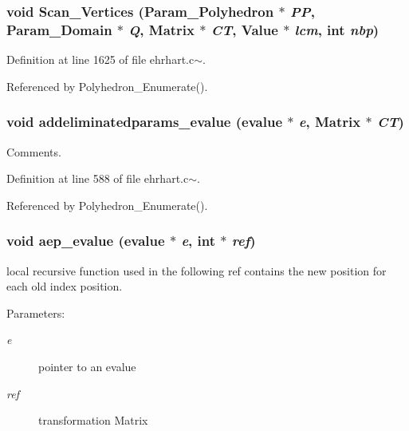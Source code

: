 \subsubsection{\setlength{\rightskip}{0pt plus 5cm}void Scan\_\-Vertices (Param\_\-Polyhedron $\ast$ {\em PP}, Param\_\-Domain $\ast$ {\em Q}, Matrix $\ast$ {\em CT}, Value $\ast$ {\em lcm}, int {\em nbp})\hspace{0.3cm}{\tt  [static]}}\label{ehrhart_8c~_a25}




Definition at line 1625 of file ehrhart.c$\sim$.

Referenced by Polyhedron\_\-Enumerate().

\subsubsection{\setlength{\rightskip}{0pt plus 5cm}void addeliminatedparams\_\-evalue (evalue $\ast$ {\em e}, Matrix $\ast$ {\em CT})\hspace{0.3cm}{\tt  [static]}}\label{ehrhart_8c~_a18}


Comments.



Definition at line 588 of file ehrhart.c$\sim$.

Referenced by Polyhedron\_\-Enumerate().

\subsubsection{\setlength{\rightskip}{0pt plus 5cm}void aep\_\-evalue (evalue $\ast$ {\em e}, int $\ast$ {\em ref})\hspace{0.3cm}{\tt  [static]}}\label{ehrhart_8c~_a17}


local recursive function used in the following ref contains the new position for each old index position.

\begin{Desc}
\item[Parameters: ]\par
\begin{description}
\item[{\em 
e}]pointer to an evalue \item[{\em 
ref}]transformation Matrix \end{description}
\end{Desc}


